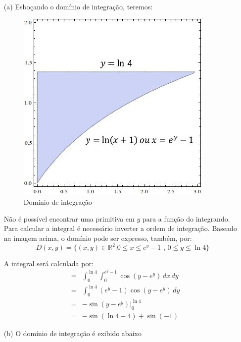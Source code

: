 \documentclass[12pt,a4paper]{article}
\newcommand{\re}{\mathbb{R}}
\begin{document}
\begin{itemize}
    \item[(a)] Esboçando o domínio de integração, teremos:
    \\
    

\begin{figure}[h!]
	\centering
	\includegraphics[scale=0.5]{Q1aB.jpg}  
	\caption{Domínio de integração}
	\label{fig:figura7}
\end{figure}

Não é possível encontrar uma primitiva em $y$ para a função do integrando. Para calcular a integral é necessário inverter a ordem de integração. Baseado na imagem acima, o domínio pode ser expresso, também, por:
$$D(x,y)=\{(x,y)\in\re^2 | 0\leq x \leq e^y-1\,\, \mbox{,}\,\,0\leq y \leq \ln{4}\}$$

A integral será calculada por:
\begin{eqnarray*}
&=&\int_0^{\ln{4}}\!\!\!\int_0^{e^y-1}\cos{(y-e^y)}\,dx\,dy\\
&=&\int_0^{\ln{4}} (e^y-1)\cos{(y-e^y)}\,dy\\
&=&-\sin{(y-e^y)}\Big|_0^{\ln{4}}\\
&=&-\sin{(\ln{4}-4)}+\sin{(-1)}
\end{eqnarray*}


    \item[(b)] O domínio de integração é exibido abaixo


\end{itemize}
\end{document}
